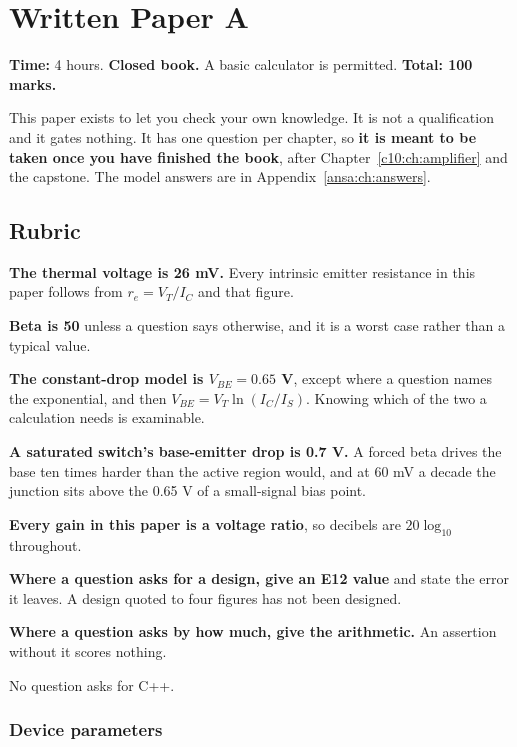
\chapter{Written Paper A}
\label{exa:ch:paper}

\noindent\textbf{Time:} 4 hours. \textbf{Closed book.} A basic calculator is
permitted. \textbf{Total: 100 marks.}

This paper exists to let you check your own knowledge. It is not a qualification and
it gates nothing. It has one question per chapter, so \textbf{it is meant to be taken
once you have finished the book}, after Chapter~\ref{c10:ch:amplifier} and the
capstone. The model answers are in Appendix~\ref{ansa:ch:answers}.

\section*{Rubric}

\textbf{The thermal voltage is 26 mV.} Every intrinsic emitter resistance in this paper follows from $r_e = V_T/I_C$ and that figure.

\textbf{Beta is 50} unless a question says otherwise, and it is a worst case rather than a typical value.

\textbf{The constant-drop model is $V_{BE} = 0.65$ V}, except where a question names the exponential, and then $V_{BE} = V_T\ln(I_C/I_S)$. Knowing which of the two a calculation needs is examinable.

\textbf{A saturated switch's base-emitter drop is 0.7 V.} A forced beta drives the base ten times harder than the active region would, and at 60 mV a decade the junction sits above the 0.65 V of a small-signal bias point.

\textbf{Every gain in this paper is a voltage ratio}, so decibels are $20\log_{10}$ throughout.

\textbf{Where a question asks for a design, give an E12 value} and state the error it leaves. A design quoted to four figures has not been designed.

\textbf{Where a question asks by how much, give the arithmetic.} An assertion without it scores nothing.

No question asks for C++.

\subsection*{Device parameters}

